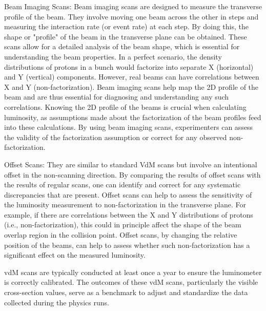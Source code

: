 Beam Imaging Scans: Beam imaging scans are designed to measure the transverse profile of the beam. They involve moving one beam across the other in steps and measuring the interaction rate (or event rate) at each step. By doing this, the shape or "profile" of the beam in the transverse plane can be obtained. These scans allow for a detailed analysis of the beam shape, which is essential for understanding the beam properties. In a perfect scenario, the density distributions of protons in a bunch would factorize into separate X (horizontal) and Y (vertical) components. However, real beams can have correlations between X and Y (non-factorization). Beam imaging scans help map the 2D profile of the beam and are thus essential for diagnosing and understanding any such correlations. Knowing the 2D profile of the beams is crucial when calculating luminosity, as assumptions made about the factorization of the beam profiles feed into these calculations. By using beam imaging scans, experimenters can assess the validity of the factorization assumption or correct for any observed non-factorization.

Offset Scans: %
They are similar to standard VdM scans but involve an intentional offset in the non-scanning direction. By comparing the results of offset scans with the results of regular scans, one can identify and correct for any systematic discrepancies that are present. Offset scans can help to assess the sensitivity of the luminosity measurement to non-factorization in the transverse plane. For example, if there are correlations between the X and Y distributions of protons (i.e., non-factorization), this could in principle affect the shape of the beam overlap region in the collision point. Offset scans, by changing the relative position of the beams, can help to assess whether such non-factorization has a significant effect on the measured luminosity.

vdM scans are typically conducted at least once a year to ensure the luminometer is correctly calibrated. The outcomes of these vdM scans, particularly the visible cross-section values, serve as a benchmark to adjust and standardize the data collected during the physics runs. 


